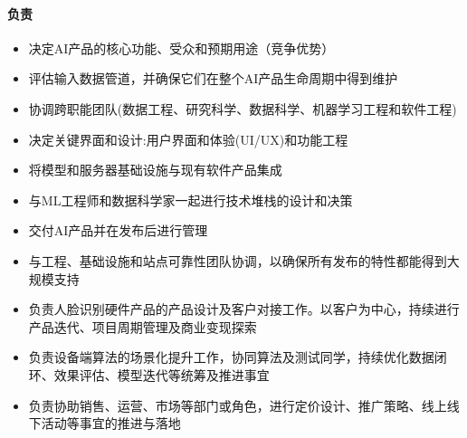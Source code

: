 \documentclass[letterpaper,11pt,english]{sphinxmanual}
\begin{document}
\paragraph{负责}
\label{\detokenize{chapter_introduction/AI_PM:id11}}\begin{itemize}
\item {} 
决定AI产品的核心功能、受众和预期用途（竞争优势）

\item {} 
评估输入数据管道，并确保它们在整个AI产品生命周期中得到维护

\item {} 
协调跨职能团队(数据工程、研究科学、数据科学、机器学习工程和软件工程)

\item {} 
决定关键界面和设计:用户界面和体验(UI/UX)和功能工程

\item {} 
将模型和服务器基础设施与现有软件产品集成

\item {} 
与ML工程师和数据科学家一起进行技术堆栈的设计和决策

\item {} 
交付AI产品并在发布后进行管理

\item {} 
与工程、基础设施和站点可靠性团队协调，以确保所有发布的特性都能得到大规模支持

\item {} 
负责人脸识别硬件产品的产品设计及客户对接工作。以客户为中心，持续进行产品迭代、项目周期管理及商业变现探索

\item {} 
负责设备端算法的场景化提升工作，协同算法及测试同学，持续优化数据闭环、效果评估、模型迭代等统筹及推进事宜

\item {} 
负责协助销售、运营、市场等部门或角色，进行定价设计、推广策略、线上线下活动等事宜的推进与落地
%
\begin{footnote}[229]\sphinxAtStartFootnote
{}
%
\end{footnote}

\end{itemize}
\end{document}
